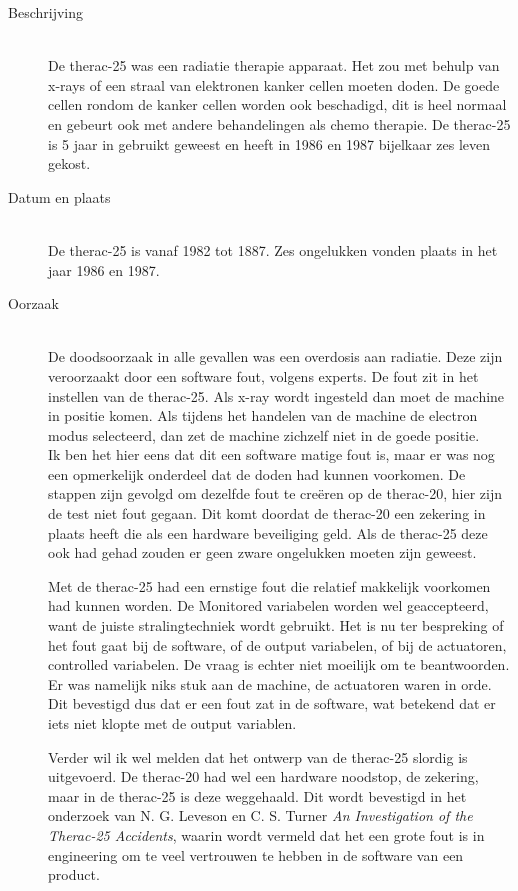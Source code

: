 \documentclass{article}%
\begin{document}
\begin{description}
\item[Beschrijving] \hfill \\
De therac-25 was een radiatie therapie apparaat. Het zou met behulp van x-rays of een straal van elektronen kanker cellen moeten doden. De goede cellen rondom de kanker cellen worden ook beschadigd, dit is heel normaal en gebeurt ook met andere behandelingen als chemo therapie. De therac-25 is 5 jaar in gebruikt geweest en heeft in 1986 en 1987 bijelkaar zes leven gekost.
\item[Datum en plaats] \hfill\\
De therac-25 is vanaf 1982 tot 1887. Zes ongelukken vonden plaats in het jaar 1986 en 1987.
\item[Oorzaak] \hfill \\
De doodsoorzaak in alle gevallen was een overdosis aan radiatie. Deze zijn veroorzaakt door een software fout, volgens experts. De fout zit in het instellen van de therac-25. Als x-ray wordt ingesteld dan moet de machine in positie komen. Als tijdens het handelen van de machine de electron modus selecteerd, dan zet de machine zichzelf niet in de goede positie.\\
Ik ben het hier eens dat dit een software matige fout is, maar er was nog een opmerkelijk onderdeel dat de doden had kunnen voorkomen. De stappen zijn gevolgd om dezelfde fout te creëren op de therac-20, hier zijn de test niet fout gegaan. Dit komt doordat de therac-20 een zekering in plaats heeft die als een hardware beveiliging geld. Als de therac-25 deze ook had gehad zouden er geen zware ongelukken moeten zijn geweest.

Met de therac-25 had een ernstige fout die relatief makkelijk voorkomen had kunnen worden. De Monitored variabelen worden wel geaccepteerd, want de juiste stralingtechniek wordt gebruikt. Het is nu ter bespreking of het fout gaat bij de software, of de output variabelen, of bij de actuatoren, controlled variabelen.
De vraag is echter niet moeilijk om te beantwoorden. Er was namelijk niks stuk aan de machine, de actuatoren waren in orde. Dit bevestigd dus dat er een fout zat in de software, wat betekend dat er iets niet klopte met de output variablen.

Verder wil ik wel melden dat het ontwerp van de therac-25 slordig is uitgevoerd. De therac-20 had wel een hardware noodstop, de zekering, maar in de therac-25 is deze weggehaald. Dit wordt bevestigd in het onderzoek van N. G. Leveson en C. S. Turner \textit{An Investigation of the Therac-25 Accidents}\cite{therac25}, waarin wordt vermeld dat het een grote fout is in engineering om te veel vertrouwen te hebben in de software van een product.
\end{description}
\end{document}

